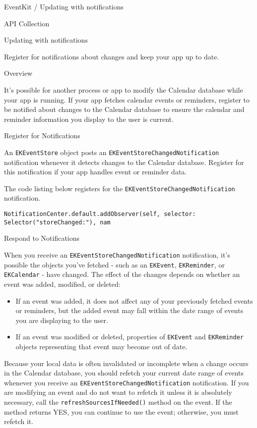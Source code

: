 \documentclass{article}
\title{}
\author{}
\date{}
\begin{document}
EventKit / Updating with notifications

API Collection

Updating with notifications

Register for notifications about changes and keep your app up to date.

Overview

It's possible for another process or app to modify the Calendar database while your app is running. If your app
fetches calendar events or reminders, register to be notified about changes to the Calendar database to ensure
the calendar and reminder information you display to the user is current.

Register for Notifications

An \texttt{EKEventStore} object posts an \texttt{EKEventStoreChangedNotification} notification whenever it detects
changes to the Calendar database. Register for this notification if your app handles event or reminder data.

The code listing below registers for the \texttt{EKEventStoreChangedNotification} notification.

\texttt{NotificationCenter.default.addObserver(self, selector: Selector("storeChanged:"), nam}

Respond to Notifications

When you receive an \texttt{EKEventStoreChangedNotification} notification, it's possible the objects you've
fetched - such as an \texttt{EKEvent}, \texttt{EKReminder}, or \texttt{EKCalendar} - have changed. The effect of the changes
depends on whether an event was added, modified, or deleted:

\begin{itemize}
    \item If an event was added, it does not affect any of your previously fetched events or reminders, but the added event may fall within the date range of events you are displaying to the user.
    \item If an event was modified or deleted, properties of \texttt{EKEvent} and \texttt{EKReminder} objects representing that event may become out of date.
\end{itemize}

Because your local data is often invalidated or incomplete when a change occurs in the Calendar database, you should refetch your current date range of events whenever you receive an \texttt{EKEventStoreChangedNotification} notification. If you are modifying an event and do not want to refetch it unless it is absolutely necessary, call the \texttt{refreshSourcesIfNeeded()} method on the event. If the method returns YES, you can continue to use the event; otherwise, you must refetch it.
\end{document}
